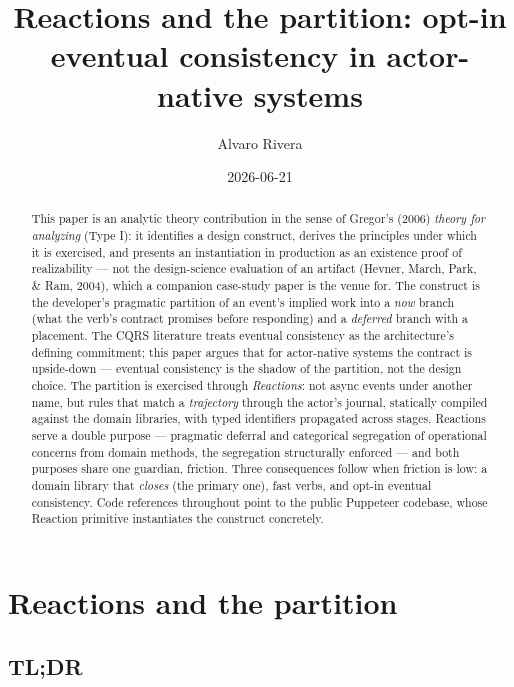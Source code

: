\documentclass[
]{article}
\title{Reactions and the partition: opt-in eventual consistency in
actor-native systems}
\author{Alvaro Rivera}
\date{2026-06-21}
\begin{document}
\maketitle
\begin{abstract}
This paper is an analytic theory contribution in the sense of Gregor's
(2006) \emph{theory for analyzing} (Type I): it identifies a design
construct, derives the principles under which it is exercised, and
presents an instantiation in production as an existence proof of
realizability --- not the design-science evaluation of an artifact
(Hevner, March, Park, \& Ram, 2004), which a companion case-study paper
is the venue for. The construct is the developer's pragmatic partition
of an event's implied work into a \emph{now} branch (what the verb's
contract promises before responding) and a \emph{deferred} branch with a
placement. The CQRS literature treats eventual consistency as the
architecture's defining commitment; this paper argues that for
actor-native systems the contract is upside-down --- eventual
consistency is the shadow of the partition, not the design choice. The
partition is exercised through \emph{Reactions}: not async events under
another name, but rules that match a \emph{trajectory} through the
actor's journal, statically compiled against the domain libraries, with
typed identifiers propagated across stages. Reactions serve a double
purpose --- pragmatic deferral and categorical segregation of
operational concerns from domain methods, the segregation structurally
enforced --- and both purposes share one guardian, friction. Three
consequences follow when friction is low: a domain library that
\emph{closes} (the primary one), fast verbs, and opt-in eventual
consistency. Code references throughout point to the public Puppeteer
codebase, whose Reaction primitive instantiates the construct
concretely.
\end{abstract}

\section{Reactions and the partition}\label{reactions-and-the-partition}

\subsection{TL;DR}\label{tldr}
\end{document}
